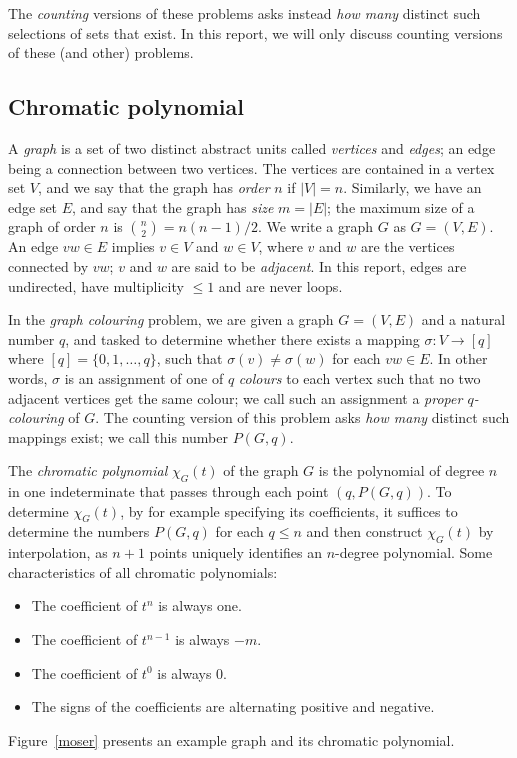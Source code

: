 \documentclass{cslthse-msc}
\begin{document}
The \emph{counting} versions of these problems asks instead \emph{how many} distinct such selections of sets that exist. In this report, we will only discuss counting versions of these (and other) problems.

\subsection{Chromatic polynomial}
A \emph{graph} is a set of two distinct abstract units called \emph{vertices} and \emph{edges}; an edge being a connection between two vertices. The vertices are contained in a vertex set $V$, and we say that the graph has \emph{order} $n$ if $|V| = n$. Similarly, we have an edge set $E$, and say that the graph has \emph{size} $m = |E|$; the maximum size of a graph of order $n$ is $\binom{n}{2} = n(n-1)/2$. We write a graph $G$ as $G = (V,E)$. An edge $vw \in E$ implies $v \in V$ and $w \in V$, where $v$ and $w$ are the vertices connected by $vw$; $v$ and $w$ are said to be \emph{adjacent}. In this report, edges are undirected, have multiplicity $\leq 1$ and are never loops.

In the \emph{graph colouring} problem, we are given a graph $G = (V,E)$ and a natural number $q$, and tasked to determine whether there exists a mapping $\sigma: V \rightarrow [q]$ where $[q] = \{0,1,\ldots,q\}$, such that $\sigma(v) \neq \sigma(w)$ for each $vw \in E$. In other words, $\sigma$ is an assignment of one of $q$ \emph{colours} to each vertex such that no two adjacent vertices get the same colour; we call such an assignment a \emph{proper $q$-colouring} of $G$. The counting version of this problem asks \emph{how many} distinct such mappings exist; we call this number $P(G,q)$.

The \emph{chromatic polynomial} $\chi_G(t)$ of the graph $G$ is the polynomial of degree $n$ in one indeterminate that passes through each point $(q, P(G,q))$. To determine $\chi_G(t)$, by for example specifying its coefficients, it suffices to determine the numbers $P(G,q)$ for each $q \leq n$ and then construct $\chi_G(t)$ by interpolation, as $n + 1$ points uniquely identifies an $n$-degree polynomial. Some characteristics of all chromatic polynomials:
\begin{itemize}
 \item The coefficient of $t^n$ is always one.
 \item The coefficient of $t^{n-1}$ is always $-m$.
 \item The coefficient of $t^0$ is always 0.
 \item The signs of the coefficients are alternating positive and negative.
\end{itemize}
Figure~\ref{moser} presents an example graph and its chromatic polynomial.
\end{document}
